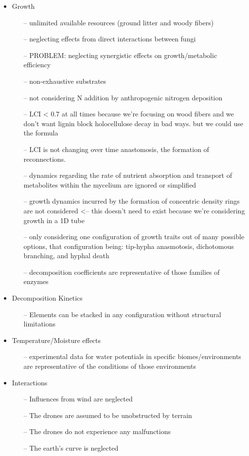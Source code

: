 \documentclass[12pt]{article}
\begin{document}
\begin{multicols}{2}
\begin{itemize}
	\item Growth
	\begin{itemize}
		\item[--] unlimited available resources (ground litter and woody fibers)
		\item[--] neglecting effects from direct interactions between fungi
		\item[--] PROBLEM: neglecting synergistic effects on growth/metabolic efficiency
		\item[--] non-exhaustive substrates
		\item[--] not considering N addition by anthropogenic nitrogen deposition
		\item[--] LCI < 0.7 at all times because we're focusing on wood fibers and we don't want lignin block holocellulose decay in bad ways. but we could use the formula
		\item[--] LCI is not changing over time anastomosis, the formation of reconnections. 
		\item[--] dynamics regarding the rate of nutrient absorption and transport of metabolites within the
		mycelium are ignored or simplified
		\item[--] growth dynamics incurred by the formation of concentric density rings are not considered <-- this doesn't need to exist because we're considering growth in a 1D tube
		\item[--] only considering one configuration of growth traits out of many possible options, that configuration being: tip-hypha anasmotosis, dichotomous branching, and hyphal death
		\item[--] decomposition coefficients are representative of those families of enzymes
	\end{itemize}
	\item Decomposition Kinetics
	\begin{itemize}
		\item[--] Elements can be stacked in any configuration without structural limitations
	\end{itemize}
	\item Temperature/Moisture effects
	\begin{itemize}
		\item[--] experimental data for water potentials in specific biomes/environments are representative of the conditions of those environments 
	\end{itemize}
	\item Interactions
	\begin{itemize}
		\item[--] Influences from wind are neglected
		\item[--] The drones are assumed to be unobstructed by terrain
		\item[--] The drones do not experience any malfunctions
		\item[--] The earth’s curve is neglected
	\end{itemize}
\end{itemize}



\end{multicols}
\end{document}

